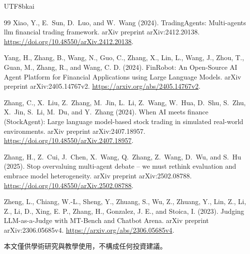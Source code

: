 \documentclass[12pt,a4paper]{article}
\begin{document}
\begin{CJK}{UTF8}{bkai}
\begin{thebibliography}{99}
Xiao, Y., E.~Sun, D.~Luo, and W.~Wang (2024).
\newblock TradingAgents: Multi-agents llm financial trading framework.
\newblock arXiv preprint arXiv:2412.20138.
\newblock \url{https://doi.org/10.48550/arXiv.2412.20138}.

Yang, H., Zhang, B., Wang, N., Guo, C., Zhang, X., Lin, L., Wang, J., Zhou, T., Guan, M., Zhang, R., and Wang, C. D. (2024).
\newblock FinRobot: An Open-Source AI Agent Platform for Financial Applications using Large Language Models.
\newblock arXiv preprint arXiv:2405.14767v2.
\newblock \url{https://arxiv.org/abs/2405.14767v2}.

Zhang, C., X.~Liu, Z.~Zhang, M.~Jin, L.~Li, Z.~Wang, W.~Hua, D.~Shu, S.~Zhu,
  X.~Jin, S.~Li, M.~Du, and Y.~Zhang (2024).
\newblock When {AI} meets finance ({StockAgent}): Large language model-based
  stock trading in simulated real-world environments.
\newblock arXiv preprint arXiv:2407.18957.
\newblock \url{https://doi.org/10.48550/arXiv.2407.18957}.

Zhang, H., Z.~Cui, J.~Chen, X.~Wang, Q.~Zhang, Z.~Wang, D.~Wu, and S.~Hu
  (2025).
\newblock Stop overvaluing multi-agent debate -- we must rethink evaluation and
  embrace model heterogeneity.
\newblock arXiv preprint arXiv:2502.08788.
\newblock \url{https://doi.org/10.48550/arXiv.2502.08788}.

Zheng, L., Chiang, W.-L., Sheng, Y., Zhuang, S., Wu, Z., Zhuang, Y., Lin, Z., Li, Z., Li, D., Xing, E. P., Zhang, H., Gonzalez, J. E., and Stoica, I. (2023).
\newblock Judging LLM-as-a-Judge with MT-Bench and Chatbot Arena.
\newblock arXiv preprint arXiv:2306.05685v4.
\newblock \url{https://arxiv.org/abs/2306.05685v4}.

\end{thebibliography}

\vspace{0.3cm}
\noindent\small 本文僅供學術研究與教學使用，不構成任何投資建議。
\end{CJK}
\end{document}
